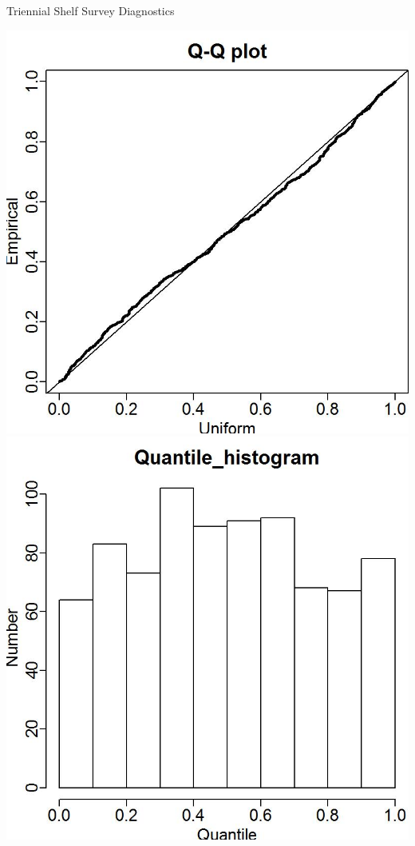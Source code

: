 \documentclass[pdf]{beamer}\usepackage[]{graphicx}\usepackage[]{color}
\begin{document}
\begin{frame}{Triennial Shelf Survey Diagnostics}
  \begin{center}
  \includegraphics[scale = 0.50]{figures/Tri_Q-Q_plot.jpg}
  \includegraphics[scale = 0.50]{figures/Tri_Q-Q_hist.jpg}
  \end{center}
\end{frame}
\end{document}
